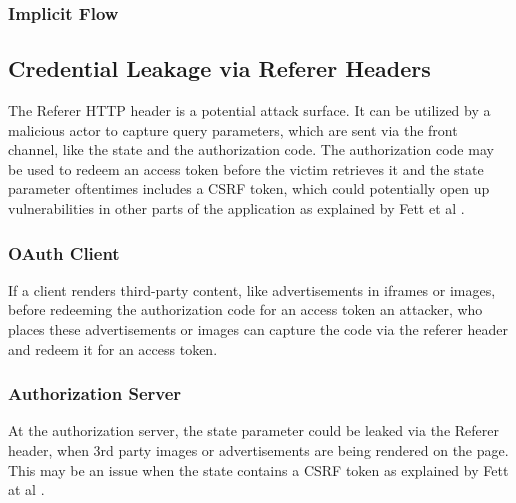 \documentclass[
    fontsize=12pt,
    headings=small,
    parskip=half,           %
    bibliography=totoc,
    numbers=noenddot,       %
    open=any,               %
    ]{scrreprt}
\begin{document}
\subsubsection{Implicit Flow}


\subsection{Credential Leakage via Referer Headers}
The Referer HTTP header is a potential attack surface. It can be utilized by a
malicious actor to capture query parameters, which are sent via the front
channel, like the state and the authorization code. The authorization code may
be used to redeem an access token before the victim retrieves it and the state
parameter oftentimes includes a CSRF token, which could potentially open up
vulnerabilities in other parts of the application as explained by Fett et al
\cite{fett2016comprehensive}.

\subsubsection{OAuth Client}
If a client renders third-party content, like advertisements in iframes or
images, before redeeming the authorization code for an access token an
attacker, who places these advertisements or images can capture the code via
the referer header and redeem it for an access token.

\subsubsection{Authorization Server}
At the authorization server, the state parameter could be leaked via the
Referer header, when 3rd party images or advertisements are being rendered on
the page. This may be an issue when the state contains a CSRF token as
explained by Fett at al \cite{fett2016comprehensive}.
\end{document}
